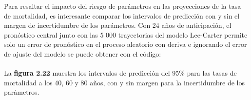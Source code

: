 Para resaltar el impacto del riesgo de parámetros en las proyecciones de la tasa de mortalidad, es interesante comparar los intervalos de predicción con y sin el margen de incertidumbre de los parámetros. Con 24 años de anticipación, el pronóstico central junto con las 5 000 trayectorias del modelo Lee-Carter permite solo un error de pronóstico en el proceso aleatorio con deriva e ignorando el error de ajuste del modelo se puede obtener con el código:\\

{
\setlength{\fboxsep}{0.75pt}%
\noindent\setlength{\fboxrule}{0pt}%
}\\

La \textbf{figura 2.22} muestra los intervalos de predicción del 95\% para las tasas de mortalidad a los 40, 60 y 80 años, con y sin margen para la incertidumbre de los parámetros.

